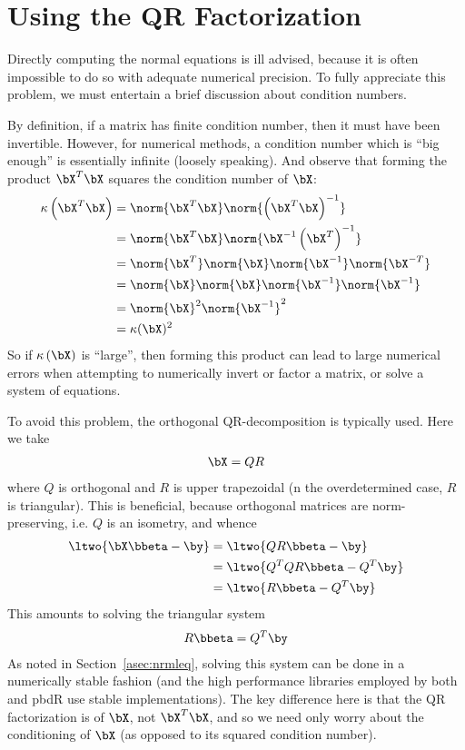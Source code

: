 \section{Using the QR Factorization}
\label{asec:qr}
Directly computing the normal equations is ill advised, because it is often impossible to do so with adequate numerical precision.  To fully appreciate this problem, we must entertain a brief discussion about condition numbers.

By definition, if a matrix has finite condition number, then it must have been invertible.  However, for numerical methods, a condition number which is ``big enough'' is essentially infinite (loosely speaking).  And observe that forming the product $\bX^T\bX$ squares the condition number of $\bX$:
\begin{align*}
\kappa\left(\bX^T\bX\right) &= \norm{\bX^T\bX}\norm{\left(\bX^T\bX\right)^{-1}}\\
  &=\norm{\bX^T\bX} \norm{\bX^{-1}\left(\bX^T\right)^{-1}}\\
  &=\norm{\bX^T} \norm{\bX} \norm{\bX^{-1}} \norm{\bX^{-T}}\\
  &=\norm{\bX} \norm{\bX} \norm{\bX^{-1}} \norm{\bX^{-1}}\\
  &= \norm{\bX}^2 \norm{\bX^{-1}}^2\\
  &=\kappa(\bX)^2
\end{align*}
So if $\kappa\left(\bX\right)$ is ``large'', then forming this product can lead to large numerical errors when attempting to numerically invert or factor a matrix, or solve a system of equations.

To avoid this problem, the orthogonal QR-decomposition is typically used.  Here we take 
\begin{align*}
\bX=QR
\end{align*}
where $Q$ is orthogonal and $R$ is upper trapezoidal (n the overdetermined case, $R$ is triangular).  This is beneficial, because orthogonal matrices are norm-preserving, i.e. $Q$ is an isometry, and whence
\begin{align*}
\ltwo{\bX\bbeta - \by} &= \ltwo{QR\bbeta - \by}\\
  &= \ltwo{Q^TQR\bbeta - Q^T\by}\\
  &= \ltwo{R\bbeta - Q^T\by}
\end{align*}
This amounts to solving the triangular system
\begin{align*}
R\bbeta = Q^T\by
\end{align*}
As noted in Section~\ref{asec:nrmleq}, solving this system can be done in a numerically stable fashion (and the high performance libraries employed by both  and pbdR use stable implementations).  The key difference here is that the QR factorization is of $\bX$, not $\bX^T\bX$, and so we need only worry about the conditioning of $\bX$ (as opposed to its squared condition number).

